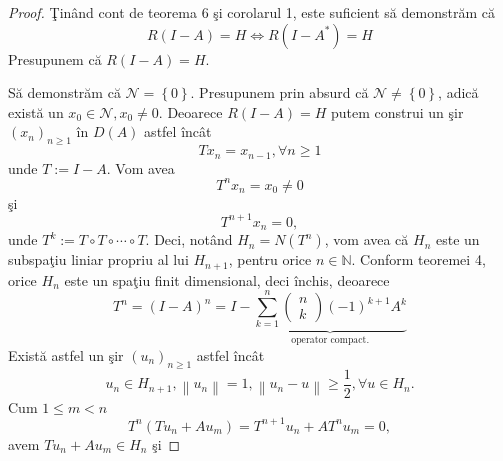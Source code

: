 \documentclass[a4paper,12pt,oneside]{report}
\begin{document}
\begin{proof}
\c{T}in\^{a}nd cont de teorema 6 \c{s}i corolarul 1, este suficient s\u{a} demonstr\u{a}m c\u{a}
\begin{displaymath}
  R\left ( I - A \right ) =H \Leftrightarrow  R\left ( I - A^{\ast } \right ) =H\label{eq:1.12} \tag{1.12}
\end{displaymath}
Presupunem c\u{a} \(R\left ( I - A \right ) =H\).

S\u{a} demonstr\u{a}m c\u{a} \({\mathcal{N}} = \left \{ 0 \right \}\). Presupunem prin absurd c\u{a} \({\mathcal{N}} \neq  \left \{ 0 \right \}\), adic\u{a} exist\u{a} un \(x_{0 } \in {\mathcal{N}}, x_{0}\neq 0\). Deoarece \(R\left ( I-A \right ) = H\) putem construi un \c{s}ir \(\left (x_{n}  \right )_{n\geq 1}\) \^{i}n \(D\left ( A \right )\) astfel \^{i}nc\^{a}t
\begin{displaymath}
  Tx_{n} = x_{n-1}, \forall n\geq 1
\end{displaymath}
unde \(T:= I - A\). Vom avea
\begin{displaymath}
  T^{n}x_{n} = x_{0}\neq 0
\end{displaymath}
\c{s}i
\begin{displaymath}
  T^{n+1}x_{n} = 0,
\end{displaymath}
unde \(T^{k}:= T\circ T\circ \cdots \circ T\). Deci, not\^{a}nd \(H_{n} = N\left ( T^{n} \right )\), vom avea c\u{a} \(H_{n}\) este un subspa\c{t}iu liniar propriu al lui \(H_{n+1}\), pentru orice \(n \in \mathbb{N}\). Conform teoremei 4, orice \(H_{n}\) este un spa\c{t}iu finit dimensional, deci \^{i}nchis, deoarece
\begin{displaymath}
  T^{n} = \left ( I - A \right )^{n} = I - \underbrace{\sum_{k=1}^{n}\begin{pmatrix}
n\\
k
\end{pmatrix}\left ( -1 \right )^{k+1}A^{k}} _{\text{operator compact.}}
\end{displaymath}
Exist\u{a} astfel un \c{s}ir \(\left ( u_{n} \right )_{n\geq 1}\) astfel \^{i}nc\^{a}t
\begin{displaymath}
  u_{n} \in H_{n+1}, \left \| u_{n} \right \| = 1, \left \| u_{n}-u \right \|\geq \frac{1}{2}, \forall u \in H_{n}.
\end{displaymath}
Cum \(1\leq m< n\)
\begin{displaymath}
  T^{n}\left ( Tu_{n} +Au_{m}\right ) = T^{n+1}u_{n} + AT^{n}u_{m} = 0,
\end{displaymath}
avem \(Tu_{n} +Au_{m} \in H_{n} \) \c{s}i

\end{proof}
\end{document}
